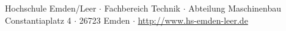 \begin{titlepage}
    
    \vspace{3cm}
    \small
    \begin{center}
        Hochschule Emden/Leer $\cdot$ 
        Fachbereich Technik $\cdot$ 
        Abteilung Maschinenbau \\
        Constantiaplatz 4 $\cdot$ 
        26723 Emden $\cdot$ 
        \url{http://www.hs-emden-leer.de}
    \end{center}
    
\end{titlepage}
